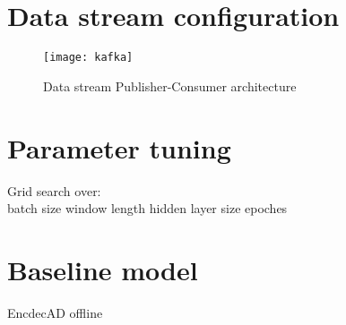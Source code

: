 \section{Data stream configuration}
\label{sec:datastream}

\begin{figure}[h]
\centering
\texttt{[image: kafka]}
\caption[Data stream Publisher-Consumer architecture]{Data stream Publisher-Consumer architecture}
\label{fig:kafka}
\end{figure}

\section{Parameter tuning}
\label{sec:parametertuning}

Grid search over: \\
batch size
window length
hidden layer size
epoches


\section{Baseline model}
\label{baseline}
EncdecAD offline











